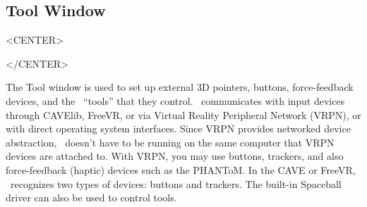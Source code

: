 %
%
%


\subsection{Tool Window}
\label{ug:ui:window:tool}
\begin{rawhtml}
<CENTER>
\end{rawhtml}
\begin{rawhtml}
</CENTER>
\end{rawhtml}

The {\sf Tool} window is used to set up external 3D pointers,
buttons, force-feedback devices, and the \VMD\ ``tools'' that they
control.  \VMD\ communicates with input devices through
CAVElib, FreeVR, or via Virtual Reality Peripheral Network (VRPN),
or with direct operating system interfaces.  
Since VRPN provides networked device abstraction, \VMD\ doesn't 
have to be running on the same computer that VRPN devices are 
attached to.  With VRPN, you may use buttons, trackers,
and also force-feedback (haptic) devices such as the PHANToM.
In the CAVE or FreeVR, \VMD\ recognizes two types of devices: buttons 
and trackers.  The built-in Spaceball driver can also be used to
control tools.


